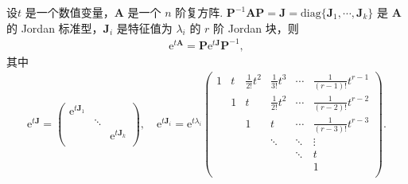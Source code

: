 \documentclass[../../main.tex]{subfiles}
\begin{document}
\begin{proposition}\label{proposition:计算e^tA}
设$t$ 是一个数值变量，$\boldsymbol{A}$ 是一个 $n$ 阶复方阵.
$\boldsymbol{P}^{-1}\boldsymbol{A}\boldsymbol{P}=\boldsymbol{J}=\mathrm{diag}\{\boldsymbol{J}_1,\cdots,\boldsymbol{J}_k\}$ 是 $\boldsymbol{A}$ 的 Jordan 标准型，$\boldsymbol{J}_i$ 是特征值为 $\lambda_i$ 的 $r$ 阶 Jordan 块，则
\begin{align*}
\mathrm{e}^{t\boldsymbol{A}}=\boldsymbol{P}\mathrm{e}^{t\boldsymbol{J}}\boldsymbol{P}^{-1},
\end{align*}
其中
\begin{align*}
\mathrm{e}^{t\boldsymbol{J}}=\left( \begin{matrix}
\mathrm{e}^{t\boldsymbol{J}_1}&		&		\\
&		\ddots&		\\
&		&		\mathrm{e}^{t\boldsymbol{J}_k}\\
\end{matrix} \right) ,\quad \mathrm{e}^{t\boldsymbol{J}_i}=\mathrm{e}^{t\lambda _i}\left( \begin{matrix}
1&		t&		\frac{1}{2!}t^2&		\frac{1}{3!}t^3&		\cdots&		\frac{1}{(r-1)!}t^{r-1}\\
&		1&		t&		\frac{1}{2!}t^2&		\cdots&		\frac{1}{(r-2)!}t^{r-2}\\
&		&		1&		t&		\cdots&		\frac{1}{(r-3)!}t^{r-3}\\
&		&		&		\ddots&		\ddots&		\vdots\\
&		&		&		&		\ddots&		t\\
&		&		&		&		&		1\\
\end{matrix} \right) .
\end{align*}
\end{proposition}
\end{document}
